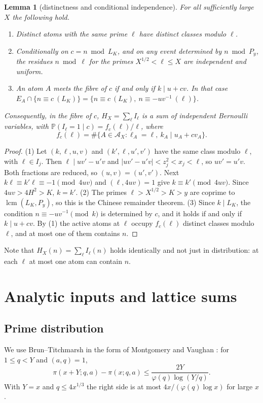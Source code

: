 \documentclass[10pt,reqno]{amsart}
\newtheorem{lemma}[theorem]{Lemma}
\theoremstyle{remark}
\newcommand{\A}{\mathcal A}
\newcommand{\Prob}{\mathbb P}
\newcommand{\lcm}{\operatorname{lcm}}
\begin{document}
\begin{lemma}[distinctness and conditional independence]\label{lem:CRT}
For all sufficiently large $X$ the following hold.
\begin{enumerate}
\item Distinct atoms with the same prime $\ell$ have distinct classes
modulo $\ell$.
\item Conditionally on $c=n\bmod L_K$, and on any event determined by
$n\bmod P_y$, the residues $n\bmod\ell$ for the primes
$X^{1/2}<\ell\leq X$ are independent and uniform.
\item An atom $A$ meets the fibre of $c$ if and only if $k\mid u+cv$.
In that case $E_A\cap\{n\equiv c\ (L_K)\}=\{n\equiv c\ (L_K),\
n\equiv-uv^{-1}\ (\ell)\}$.
\end{enumerate}
Consequently, in the fibre of $c$, $H_X=\sum_\ell I_\ell$ is a sum of
independent Bernoulli variables, with $\Prob(I_\ell=1\mid c)=f_c(\ell)/\ell$, where
\begin{equation}\label{eq:fc}
 f_c(\ell)=\#\{A\in\A_X:\ell_A=\ell,\ k_A\mid u_A+cv_A\}.
\end{equation}
\end{lemma}
\begin{proof}
(1) Let $(k,\ell,u,v)$ and $(k',\ell,u',v')$ have the same class modulo
$\ell$, with $\ell\in I_j$.  Then $\ell\mid uv'-u'v$ and
$|uv'-u'v|<z_j^2<x_j<\ell$, so $uv'=u'v$.  Both fractions are reduced, so
$(u,v)=(u',v')$.  Next $k\ell\equiv k'\ell\equiv-1\pmod{4uv}$ and
$(\ell,4uv)=1$ give $k\equiv k'\pmod{4uv}$.  Since $4uv>4H^2>K$, $k=k'$.
(2) The primes $\ell>X^{1/2}>K>y$ are coprime to $\lcm(L_K,P_y)$, so this
is the Chinese remainder theorem.  (3) Since $k\mid L_K$, the condition
$n\equiv-uv^{-1}\pmod k$ is determined by $c$, and it holds if and only if
$k\mid u+cv$.  By (1) the active atoms at $\ell$ occupy $f_c(\ell)$
distinct classes modulo $\ell$, and at most one of them contains $n$.
\end{proof}
Note that $H_X(n)=\sum_\ell I_\ell(n)$ holds identically and not just in
distribution: at each $\ell$ at most one atom can contain $n$.

\section{Analytic inputs and lattice sums}\label{sec:lattice}
\subsection*{Prime distribution}
We use Brun--Titchmarsh in the form of Montgomery and Vaughan
\cite[Thm.~2]{MV}: for $1\leq q<Y$ and $(a,q)=1$,
\begin{equation}\label{eq:BT}
 \pi(x+Y;q,a)-\pi(x;q,a)\leq\frac{2Y}{\varphi(q)\log(Y/q)}.
\end{equation}
With $Y=x$ and $q\leq4x^{1/3}$ the right side is at most
$4x/(\varphi(q)\log x)$ for large $x$.
\end{document}
